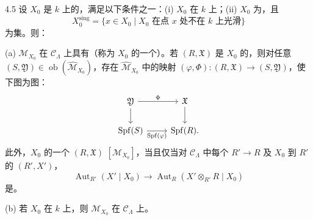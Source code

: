 \begin{SGAresult}{}{4.5}
设 $X_0$ 是 $k$ 上的，满足以下条件之一：(i) $X_0$ 在 $k$ 上；(ii) $X_0$ 为，且
\[
X_0^{\mathrm{sing}}=\{x\in X_0\mid X_0\text{ 在点 }x\text{ 处不在 }k\text{ 上光滑}\}
\]
为集。则：

(a) $\mathcal M_{X_0}$ 在 $\mathcal C_\Lambda$ 上具有（称为 $X_0$ 的一个）。若 $(R,\mathfrak X)$ 是 $X_0$ 的，则对任意 $(S,\mathfrak Y)\in\operatorname{ob}(\widehat{\mathcal M}_{X_0})$，存在 $\widehat{\mathcal M}_{X_0}$ 中的映射 $(\varphi,\Phi):(R,\mathfrak X)\to(S,\mathfrak Y)$，使下图为图：
\[
\begin{tikzcd}
\mathfrak Y\arrow[r,"\Phi"]\arrow[d]&\mathfrak X\arrow[d]\\
\operatorname{Spf}(S)\arrow[r,"\operatorname{Spf}(\varphi)"']&\operatorname{Spf}(R).
\end{tikzcd}
\]
此外，$X_0$ 的一个 $(R,\mathfrak X)$  $[\mathcal M_{X_0}]$，当且仅当对 $\mathcal C_\Lambda$ 中每个 $R'\to R$ 及 $X_0$ 到 $R'$ 的 $(R',X')$，
\[
\operatorname{Aut}_{R'}(X'\mid X_0)\longrightarrow
\operatorname{Aut}_R(X'\otimes_{R'}R\mid X_0)
\]
是。

(b) 若 $X_0$ 在 $k$ 上，则 $\mathcal M_{X_0}$ 在 $\mathcal C_\Lambda$ 上。
\end{SGAresult}
